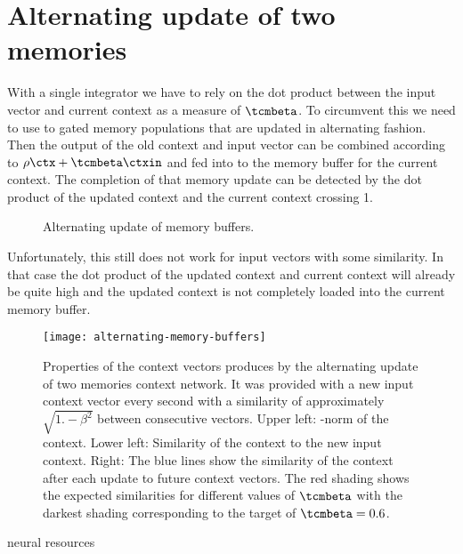 \section{Alternating update of two memories}
With a single integrator we have to rely on the dot product between the input vector and current context as a measure of $\tcmbeta$.
To circumvent this we need to use to gated memory populations that are updated in alternating fashion.
Then the output of the old context and input vector can be combined according to $\rho \ctx + \tcmbeta \ctxin$ and fed into to the memory buffer for the current context.
The completion of that memory update can be detected by the dot product of the updated context and the current context crossing 1.
\begin{figure}
    \centering
    \caption{Alternating update of memory buffers.}\label{fig:ctx-bounded-integrator}
\end{figure}

Unfortunately, this still does not work for input vectors with some similarity.
In that case the dot product of the updated context and current context will already be quite high and the updated context is not completely loaded into the current memory buffer.
\begin{figure}
    \centering
    \texttt{[image: alternating-memory-buffers]}
    \caption{
        Properties of the context vectors produces by the alternating update of two memories context network.
        It was provided with a new input context vector every second with a similarity of approximately $\sqrt{1. - \beta^2}$ between consecutive vectors.
        Upper left: \ltwo-norm of the context.
        Lower left: Similarity of the context to the new input context.
        Right: The blue lines show the similarity of the context after each update to future context vectors.
        The red shading shows the expected similarities for different values of $\tcmbeta$ with the darkest shading corresponding to the target of $\tcmbeta = 0.6$.}\label{fig:alternating-memory-buffers}
\end{figure}
neural resources


